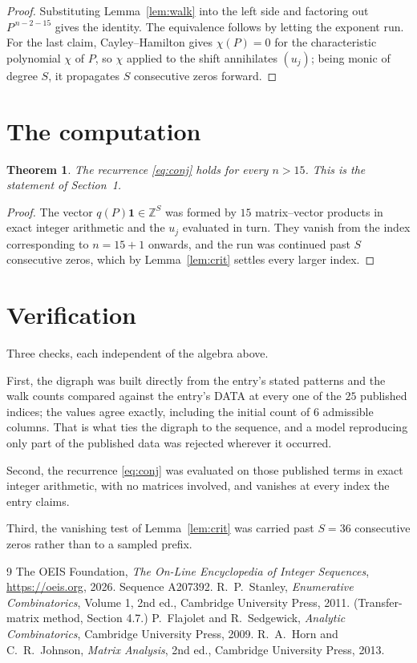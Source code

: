 \documentclass[11pt,a4paper]{article}
\theoremstyle{plain}
\newtheorem{theorem}{Theorem}
\theoremstyle{definition}
\begin{document}
\begin{proof}
Substituting Lemma~\ref{lem:walk} into the left side and factoring out
$P^{\,n-2-15}$ gives the identity. The equivalence follows by letting the exponent
run. For the last claim, Cayley--Hamilton gives $\chi(P)=0$ for the characteristic
polynomial $\chi$ of $P$, so $\chi$ applied to the shift annihilates $(u_j)$; being monic of
degree $S$, it propagates $S$ consecutive zeros forward.
\end{proof}

\section{The computation}

\begin{theorem}
The recurrence \eqref{eq:conj} holds for every $n>15$. This is the statement of
Section~1.
\end{theorem}

\begin{proof}
The vector $q(P)\mathbf{1}\in\mathbb{Z}^{S}$ was formed by $15$ matrix--vector
products in exact integer arithmetic and the $u_j$ evaluated in turn. They vanish from the
index corresponding to $n=15+1$ onwards, and the run was continued past $S$ consecutive
zeros, which by Lemma~\ref{lem:crit} settles every larger index.
\end{proof}

\section{Verification}

Three checks, each independent of the algebra above.

First, the digraph was built directly from the entry's stated patterns and the walk counts
compared against the entry's DATA at every one of the $25$ published indices; the
values agree exactly, including the initial count of $6$ admissible columns. That is
what ties the digraph to the sequence, and a model reproducing only part of the published
data was rejected wherever it occurred.

Second, the recurrence \eqref{eq:conj} was evaluated on those published terms in exact
integer arithmetic, with no matrices involved, and vanishes at every index the entry claims.

Third, the vanishing test of Lemma~\ref{lem:crit} was carried past $S=36$ consecutive
zeros rather than to a sampled prefix.

\begin{thebibliography}{9}
 The OEIS Foundation, \emph{The On-Line Encyclopedia of Integer
Sequences}, \url{https://oeis.org}, 2026. Sequence A207392.
 R.~P.~Stanley, \emph{Enumerative Combinatorics}, Volume 1, 2nd ed.,
Cambridge University Press, 2011. (Transfer-matrix method, Section 4.7.)
 P.~Flajolet and R.~Sedgewick, \emph{Analytic Combinatorics}, Cambridge
University Press, 2009.
 R.~A.~Horn and C.~R.~Johnson, \emph{Matrix Analysis}, 2nd ed., Cambridge
University Press, 2013.
\end{thebibliography}
\end{document}
